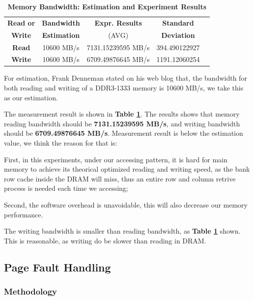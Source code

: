 \begin{table}[ht]
  \centering
  \caption{\textbf{Memory Bandwidth: Estimation and Experiment Results}}
  \begin{threeparttable}
  \begin{tabular}{ccccc}
  \hline
      \textbf{Read or} & \textbf{Bandwidth}   & \textbf{Expr. Results} & \textbf{Standard}\\
      \textbf{Write}   & \textbf{Estimation}  & (AVG)   & \textbf{Deviation} \\
  \hline
      \textbf{Read}  & 10600 MB/s & 7131.15239595 MB/s & 394.490122927  \\
      \textbf{Write} & 10600 MB/s & 6709.49876645 MB/s & 1191.12060254  \\
  \hline
  \end{tabular}
  \end{threeparttable}
  \label{memory_bandwidth_table}
\end{table}

For estimation, Frank Denneman stated on his web blog \cite{frankdenneman} that, the bandwidth for both reading and writing of a DDR3-1333 memory is 10600 MB/s, we take this as our estimation.

The measurement result is shown in \textbf{Table \ref{memory_bandwidth_table}}. The results shows that memory reading bandwidth should be \textbf{7131.15239595 MB/s}, and writing bandwidth should be \textbf{6709.49876645 MB/s}. Measurement result is below the estimation value, we think the reason for that is:

First, in this experiments, under our accessing pattern, it is hard for main memory to achieve its theorical optimized reading and writing speed, as the bank row cache inside the DRAM will miss, thus an entire row and column retrive process is needed each time we accessing;

Second, the software overhead is unavoidable, this will also decrease our memory performance.

The writing bandwidth is smaller than reading bandwidth, as \textbf{Table \ref{memory_bandwidth_table}} shown. This is reasonable, as writing do be slower than reading in DRAM.

\subsection{Page Fault Handling}

\subsubsection{Methodology}

